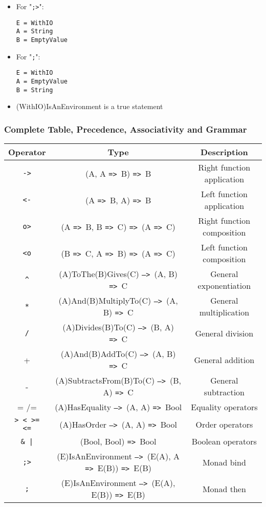 \documentclass{article}
\def\ra{\texttt{=>}\ }
\def\Ra{\texttt{-->}\ }
\begin{document}
\begin{itemize}

\item
For "\texttt{;>}":
\begin{verbatim}
E = WithIO
A = String
B = EmptyValue
\end{verbatim}

\item
For "\texttt{;}":
\begin{verbatim}
E = WithIO
A = EmptyValue
B = String
\end{verbatim}

\item (WithIO)IsAnEnvironment is a true statement
\end{itemize}

\subsubsection{Complete Table, Precedence, Associativity and Grammar}

\begin{center}
\begin{tabular}{ |c|c|c| } 
\hline
Operator & Type & Description \\ 
\hline
\hline
\texttt{->} & (A, A \ra B) \ra B & Right function application \\
\hline
\texttt{<-} & (A \ra B, A) \ra B & Left function application \\
\hline
\texttt{o>} & (A \ra B, B \ra C) \ra (A \ra C) & Right function composition \\
\hline
\texttt{<o} & (B \ra C, A \ra B) \ra (A \ra C) & Left function composition \\
\hline
\texttt{\^} & (A)ToThe(B)Gives(C) \Ra (A, B) \ra C & General exponentiation  \\
\hline
\texttt{*} & (A)And(B)MultiplyTo(C) \Ra (A, B) \ra C & General multiplication  \\
\hline
\texttt{/} & (A)Divides(B)To(C) \Ra (B, A) \ra C & General division \\
\hline
+ & (A)And(B)AddTo(C) \Ra (A, B) \ra C & General addition \\ 
\hline
- & (A)SubtractsFrom(B)To(C) \Ra (B, A) \ra C & General subtraction \\
\hline
= /= & (A)HasEquality \Ra (A, A) \ra Bool & Equality operators \\
\hline
\texttt{> < >= <=} & (A)HasOrder \Ra (A, A) \ra Bool & Order operators \\
\hline
\texttt{\& |} & (Bool, Bool) \ra Bool & Boolean operators \\
\hline
\texttt{;>} & (E)IsAnEnvironment \Ra (E(A), A \ra E(B)) \ra E(B) &
Monad bind \\
\hline
\texttt{;} & (E)IsAnEnvironment \Ra (E(A), E(B)) \ra E(B) &
Monad then \\
\hline
\end{tabular}
\end{center}
\end{document}
